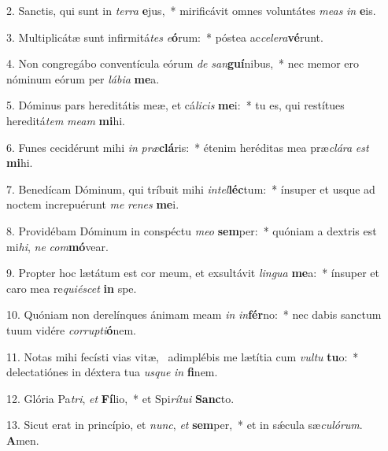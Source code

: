 2. Sanctis, qui sunt in \textit{ter}\textit{ra} \textbf{e}jus,~*  mirificávit omnes voluntátes \textit{me}\textit{as} \textit{in} \textbf{e}is.\

3. Multiplicátæ sunt infirmitá\textit{tes} \textit{e}\textbf{ó}rum:~*  póstea ac\textit{ce}\textit{le}\textit{ra}\textbf{vé}runt.\

4. Non congregábo conventícula eórum \textit{de} \textit{san}\textbf{guí}nibus,~*  nec memor ero nóminum eórum per \textit{lá}\textit{bi}\textit{a} \textbf{me}a.\

5. Dóminus pars hereditátis meæ, et cá\textit{li}\textit{cis} \textbf{me}i:~*  tu es, qui restítues hereditá\textit{tem} \textit{me}\textit{am} \textbf{mi}hi.\

6. Funes cecidérunt mihi \textit{in} \textit{præ}\textbf{clá}ris:~*  étenim heréditas mea præ\textit{clá}\textit{ra} \textit{est} \textbf{mi}hi.\

7. Benedícam Dóminum, qui tríbuit mihi \textit{in}\textit{tel}\textbf{léc}tum:~*  ínsuper et usque ad noctem increpuérunt \textit{me} \textit{re}\textit{nes} \textbf{me}i.\

8. Providébam Dóminum in conspéctu \textit{me}\textit{o} \textbf{sem}per:~*  quóniam a dextris est mi\textit{hi}, \textit{ne} \textit{com}\textbf{mó}vear.\

9. Propter hoc lætátum est cor meum, et exsultávit \textit{lin}\textit{gua} \textbf{me}a:~*  ínsuper et caro mea re\textit{qui}\textit{é}\textit{scet} \textbf{in} spe.\

10. Quóniam non derelínques ánimam meam \textit{in} \textit{in}\textbf{fér}no:~*  nec dabis sanctum tuum vidére \textit{cor}\textit{rup}\textit{ti}\textbf{ó}nem.\

11. Notas mihi fecísti vias vitæ, \dag\  adimplébis me lætítia cum \textit{vul}\textit{tu} \textbf{tu}o:~*  delectatiónes in déxtera tua \textit{us}\textit{que} \textit{in} \textbf{fi}nem.\

12. Glória Pa\textit{tri}, \textit{et} \textbf{Fí}lio,~*  et Spi\textit{rí}\textit{tu}\textit{i} \textbf{Sanc}to.\

13. Sicut erat in princípio, et \textit{nunc}, \textit{et} \textbf{sem}per,~*  et in sǽcula sæ\textit{cu}\textit{ló}\textit{rum}. \textbf{A}men.\

